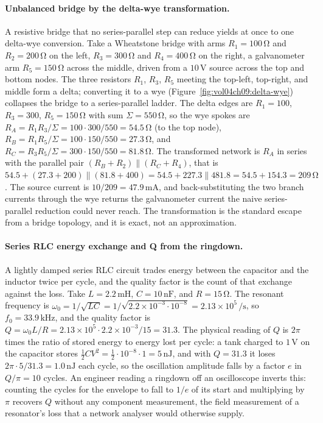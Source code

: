 \paragraph{Unbalanced bridge by the delta-wye transformation.}
A resistive bridge that no series-parallel step can reduce yields at once to
one delta-wye conversion. Take a Wheatstone bridge with arms $R_1 =
100\,\si{\ohm}$ and $R_2 = 200\,\si{\ohm}$ on the left, $R_3 = 300\,\si{
\ohm}$ and $R_4 = 400\,\si{\ohm}$ on the right, a galvanometer arm $R_5 =
150\,\si{\ohm}$ across the middle, driven from a $10\,\si{\volt}$ source
across the top and bottom nodes. The three resistors $R_1$, $R_3$, $R_5$
meeting the top-left, top-right, and middle form a delta; converting it to a
wye (Figure~\ref{fig:vol04ch09:delta-wye}) collapses the bridge to a
series-parallel ladder. The delta edges are $R_1 = 100$, $R_3 = 300$, $R_5 =
150\,\si{\ohm}$ with sum $\Sigma = 550\,\si{\ohm}$, so the wye spokes are
$R_A = R_1 R_3/\Sigma = 100\cdot 300/550 = 54.5\,\si{\ohm}$ (to the top
node), $R_B = R_1 R_5/\Sigma = 100\cdot 150/550 = 27.3\,\si{\ohm}$, and
$R_C = R_3 R_5/\Sigma = 300\cdot 150/550 = 81.8\,\si{\ohm}$. The transformed
network is $R_A$ in series with the parallel pair $(R_B + R_2)\parallel(R_C
+ R_4)$, that is $54.5 + (27.3 + 200)\parallel(81.8 + 400) = 54.5 +
227.3\parallel 481.8 = 54.5 + 154.3 = 209\,\si{\ohm}$. The source current is
$10/209 = 47.9\,\si{\milli\ampere}$, and back-substituting the two branch
currents through the wye returns the galvanometer current the naive
series-parallel reduction could never reach. The transformation is the
standard escape from a bridge topology, and it is exact, not an
approximation.



\paragraph{Series RLC energy exchange and Q from the ringdown.}
A lightly damped series RLC circuit trades energy between the capacitor and
the inductor twice per cycle, and the quality factor is the count of that
exchange against the loss. Take $L = 2.2\,\si{\milli\henry}$, $C = 10\,\si{
\nano\farad}$, and $R = 15\,\si{\ohm}$. The resonant frequency is $\omega_0
= 1/\sqrt{LC} = 1/\sqrt{2.2\times 10^{-3}\cdot 10^{-8}} = 2.13\times
10^{5}\,\si{\per\second}$, so $f_0 = 33.9\,\si{\kilo\hertz}$, and the quality
factor is $Q = \omega_0 L/R = 2.13\times 10^{5}\cdot 2.2\times 10^{-3}/15 =
31.3$. The physical reading of $Q$ is $2\pi$ times the ratio of stored energy
to energy lost per cycle: a tank charged to $1\,\si{\volt}$ on the capacitor
stores $\tfrac{1}{2}CV^2 = \tfrac{1}{2}\cdot 10^{-8}\cdot 1 = 5\,\si{\nano
\joule}$, and with $Q = 31.3$ it loses $2\pi\cdot 5/31.3 = 1.0\,\si{\nano
\joule}$ each cycle, so the oscillation amplitude falls by a factor $e$ in
$Q/\pi = 10$ cycles. An engineer reading a ringdown off an oscilloscope
inverts this: counting the cycles for the envelope to fall to $1/e$ of its
start and multiplying by $\pi$ recovers $Q$ without any component
measurement, the field measurement of a resonator's loss that a network
analyser would otherwise supply.

